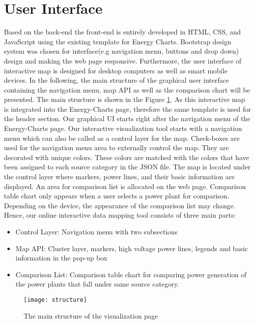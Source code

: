 \section{User Interface}
\label{sec:ui}

Based on the back-end the front-end is entirely developed in HTML, CSS, and JavaScript using the existing template for Energy Charts. Bootstrap design system was chosen for interface(e.g navigation menu, buttons and drop down) design and making the web page responsive. Furthermore, the user interface of interactive map is designed for desktop computers as well as smart mobile devices. In the following, the main structure of the graphical user interface containing the navigation menu, map API as well as the comparison chart will be presented. The main structure is shown in the Figure \ref{fig:structure}. As this interactive map is integrated into the Energy-Charts page, therefore the same template is used for the header section. Our graphical UI starts right after the navigation menu of the Energy-Charts page. Our interactive visualization tool starts with a navigation menu which can also be called as a control layer for the map. Check-boxes are used for the navigation menu area to externally control the map. They are decorated with unique colors. These colors are matched with the colors that have been assigned to each source category in the JSON file.  The map is located under the control layer where markers, power lines, and their basic information are displayed. An area for comparison list is allocated on the web page. Comparison table chart only appears when a user selects a power plant for comparison. Depending on the device, the appearance of the comparison list may change. Hence, our online interactive data mapping tool consists of three main parts: 

\begin{itemize}
	\item{Control Layer: Navigation menu with two subsections}
	\item{Map API: Cluster layer, markers, high voltage power lines, legends and basic information in the pop-up box}
	\item{Comparison List: Comparison table chart for comparing power generation of the power plants that fall under same source category.}
\end{itemize}

\begin{figure}
  \begin{center}
    \texttt{[image: structure]}
    \caption{The main structure of the visualization page}
    \label{fig:structure}
  \end{center}
\end{figure}

